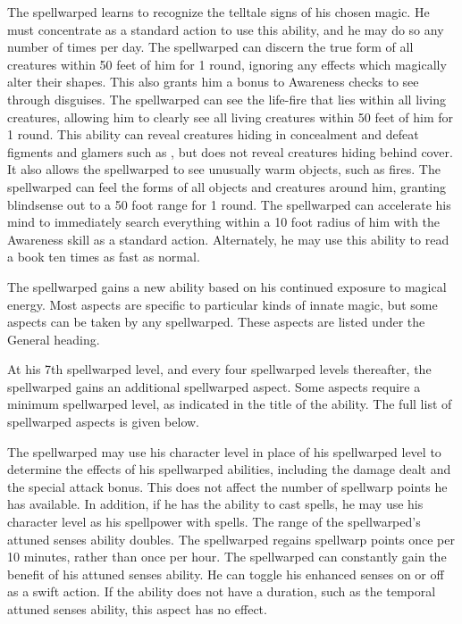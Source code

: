 The spellwarped learns to recognize the telltale signs of his chosen magic.
He must concentrate as a standard action to use this ability, and he may do so any number of times per day.
The spellwarped can discern the true form of all creatures within 50 feet of him for 1 round, ignoring any effects which magically alter their shapes.
This also grants him a  bonus to Awareness checks to see through disguises.
The spellwarped can see the life-fire that lies within all living creatures, allowing him to clearly see all living creatures within 50 feet of him for 1 round.
This ability can reveal creatures hiding in concealment and defeat figments and glamers such as , but does not reveal creatures hiding behind cover.
It also allows the spellwarped to see unusually warm objects, such as fires.
The spellwarped can feel the forms of all objects and creatures around him, granting blindsense out to a 50 foot range for 1 round.
The spellwarped can accelerate his mind to immediately search everything within a 10 foot radius of him with the Awareness skill as a standard action.
Alternately, he may use this ability to read a book ten times as fast as normal.

The spellwarped gains a new ability based on his continued exposure to magical energy.
Most aspects are specific to particular kinds of innate magic, but some aspects can be taken by any spellwarped.
These aspects are listed under the General heading.

At his 7th spellwarped level, and every four spellwarped levels thereafter, the spellwarped gains an additional spellwarped aspect.
Some aspects require a minimum spellwarped level, as indicated in the title of the ability.
The full list of spellwarped aspects is given below.

The spellwarped may use his character level in place of his spellwarped level to determine the effects of his spellwarped abilities, including the damage dealt and the special attack bonus.
This does not affect the number of spellwarp points he has available.
In addition, if he has the ability to cast spells, he may use his character level as his spellpower with spells.
The range of the spellwarped's attuned senses ability doubles.
The spellwarped regains spellwarp points once per 10 minutes, rather than once per hour.
The spellwarped can constantly gain the benefit of his attuned senses ability.
He can toggle his enhanced senses on or off as a swift action.
If the ability does not have a duration, such as the temporal attuned senses ability, this aspect has no effect.

